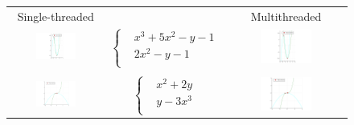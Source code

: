 \documentclass[a4paper]{article}
\theoremstyle{definition}
\theoremstyle{definition}
\theoremstyle{remark}
\theoremstyle{definition}
\begin{document}
\begin{figure}[htb]
    \begin{tabular}{c c c}
        Single-threaded & & Multithreaded \\
        \includegraphics[width=0.45\textwidth,valign=c]{../plots/solutions1.png} &
        $\left\{\begin{aligned}
                    &x^3 + 5x^2 - y - 1 \\
                    &2x^2 - y - 1 \\
        \end{aligned}\right.$ &
        \includegraphics[width=0.45\textwidth,valign=c]{../plots/solutions1_6.png} \\
        \vspace{0.5cm} \\
        \includegraphics[width=0.45\textwidth,valign=c]{../plots/solutions2.png} &
        $\left\{\begin{aligned}
                    &x^2 + 2y  \\
                    &y - 3x^3 \\
        \end{aligned}\right.$ &
        \includegraphics[width=0.45\textwidth,valign=c]{../plots/solutions2_6.png} \\

\end{tabular}
\end{figure}
\end{document}
